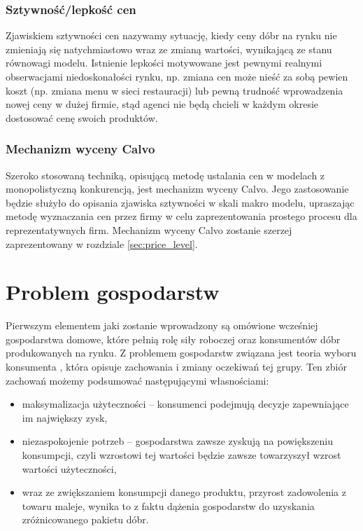 \subsubsection{Sztywność/lepkość cen}

Zjawiskiem sztywności cen nazywamy sytuację, kiedy ceny dóbr na rynku nie zmieniają się natychmiastowo wraz ze zmianą wartości, wynikającą ze stanu równowagi modelu. Istnienie lepkości motywowane jest pewnymi realnymi obserwacjami niedoskonałości rynku, np. zmiana cen może nieść za sobą pewien koszt (np. zmiana menu w sieci restauracji) lub pewną trudność wprowadzenia nowej ceny w dużej firmie, stąd agenci nie będą chcieli w każdym okresie dostosować cenę swoich produktów.

\subsubsection{Mechanizm wyceny Calvo}

Szeroko stosowaną techniką, opisującą metodę ustalania cen w modelach z monopolistyczną konkurencją, jest mechanizm wyceny Calvo. Jego zastosowanie będzie służyło do opisania zjawiska sztywności w skali makro modelu, upraszając metodę wyznaczania cen przez firmy w celu zaprezentowania prostego procesu dla reprezentatywnych firm. Mechanizm wyceny Calvo zostanie szerzej zaprezentowany w rozdziale \ref{sec:price_level}.

\section{Problem gospodarstw}

Pierwszym elementem jaki zostanie wprowadzony są omówione wcześniej gospodarstwa domowe, które pełnią rolę siły roboczej oraz konsumentów dóbr produkowanych na rynku. Z problemem gospodarstw związana jest teoria wyboru konsumenta \cite{duesenberry}, która opisuje zachowania i zmiany oczekiwań tej grupy. Ten zbiór zachowań możemy podsumować następującymi własnościami:
\begin{itemize}
    \item maksymalizacja użyteczności -- konsumenci podejmują decyzje zapewniające im największy zysk,
    \item niezaspokojenie potrzeb -- gospodarstwa zawsze zyskują na powiększeniu konsumpcji, czyli wzrostowi tej wartości będzie zawsze towarzyszył wzrost wartości użyteczności,
    \item wraz ze zwiększaniem konsumpcji danego produktu, przyrost zadowolenia z towaru maleje, wynika to z faktu dążenia gospodarstw do uzyskania zróżnicowanego pakietu dóbr.
\end{itemize}

